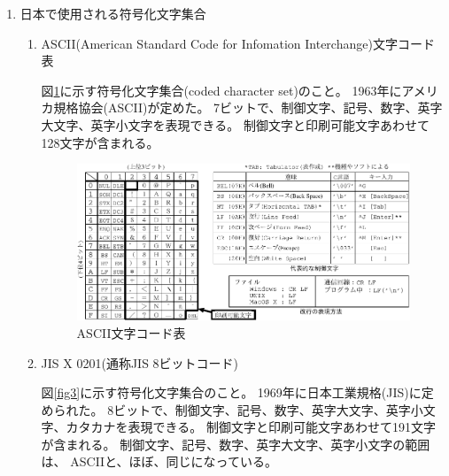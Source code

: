 \documentclass[a4j,dvipdfmx]{jarticle}
\begin{document}
\begin{enumerate}
\newpage

\item 日本で使用される符号化文字集合

\begin{enumerate}
\item ASCII(American Standard Code for Infomation Interchange)文字コード表

図\ref{fig2}に示す符号化文字集合(coded character set)のこと。
1963年にアメリカ規格協会(ASCII)が定めた。
7ビットで、制御文字、記号、数字、英字大文字、英字小文字を表現できる。
制御文字と印刷可能文字あわせて128文字が含まれる。

\begin{figure}[hbtp]
\begin{center}
\includegraphics[scale=0.9]{ascii.pdf}
\caption{ASCII文字コード表}
\label{fig2}
\end{center}
\end{figure}

\item JIS X 0201(通称JIS 8ビットコード)

図\ref{fig3}に示す符号化文字集合のこと。
1969年に日本工業規格(JIS)に定められた。
8ビットで、制御文字、記号、数字、英字大文字、英字小文字、カタカナを表現できる。
制御文字と印刷可能文字あわせて191文字が含まれる。
制御文字、記号、数字、英字大文字、英字小文字の範囲は、
ASCIIと、ほぼ、同じになっている。


\end{enumerate}
\end{enumerate}
\end{document}
